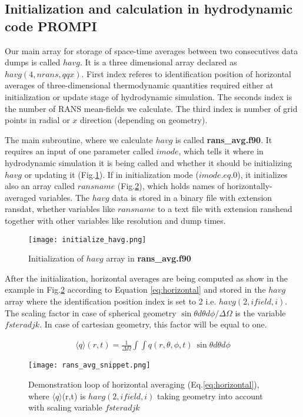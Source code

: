 \documentclass[11pt,paper=a4]{report}
\begin{document}
\subsection{Initialization and calculation in hydrodynamic code PROMPI}

Our main array for storage of space-time averages between two consecutives data dumps is called $havg$. It is a three dimensional array declared as $havg(4,nrans,qqx)$. First index referes to identification position of horizontal averages of three-dimensional thermodynamic quantities required either at initialization or update stage of hydrodynamic simulation. The seconds index is the number of RANS mean-fields we calculate. The third index is number of grid points in radial or $x$ direction (depending on geometry).

The main subroutine, where we calculate $havg$ is called {\bf rans\_avg.f90}. It requires an input of one parameter called $imode$, which tells it where in hydrodynamic simulation it is being called and whether it should be initializing $havg$ or updating it (Fig.\ref{havg:init}). If in initialization mode ($imode.eq.0$), it initializes also an array called $ransname$ (Fig.\ref{havg:calc}), which holds names of horizontally-averaged variables. The $havg$ data is stored in a binary file with extension ransdat, whether variables like $ransname$ to a text file with extension ranshead together with other variables like resolution and dump times. 

\begin{figure}[!h]
\centerline{
\texttt{[image: initialize\_havg.png]}}
\caption{Initialization of $havg$ array in {\bf rans\_avg.f90}}
\label{havg:init}
\end{figure}

After the initialization, horizontal averages are being computed as show in the example in Fig.\ref{havg:calc} according to Equation \ref{eq:horizontal}  and stored in the $havg$ array where the identification position index is set to 2 i.e. $havg(2,ifield,i)$. The scaling factor in case of spherical geometry $\sin \theta d \theta d \phi / \Delta \Omega$ is the variable $fsteradjk$. In case of cartesian geometry, this factor will be equal to one.  

\begin{align}
\label{eq:horizontal}
\langle q \rangle (r,t) = \frac{1}{\Delta \Omega} \int \int q(r,\theta,\phi,t)~\sin \theta d \theta d \phi
\end{align}

\begin{figure}[!h]
\centerline{
\texttt{[image: rans\_avg\_snippet.png]}}
\caption{Demonstration loop of horizontal averaging (Eq.\ref{eq:horizontal}), where $\langle q \rangle$(r,t) is $havg(2,ifield,i)$ taking geometry into account with scaling variable $fsteradjk$}
\label{havg:calc}
\end{figure}
\end{document}
